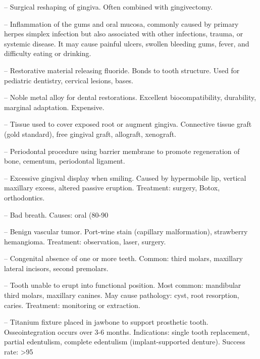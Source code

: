 -- Surgical reshaping of gingiva. Often combined with gingivectomy.

-- Inflammation of the gums and oral mucosa, commonly caused by primary herpes simplex infection but also associated with other infections, trauma, or systemic disease. It may cause painful ulcers, swollen bleeding gums, fever, and difficulty eating or drinking.

-- Restorative material releasing fluoride. Bonds to tooth structure. Used for pediatric dentistry, cervical lesions, bases.

-- Noble metal alloy for dental restorations. Excellent biocompatibility, durability, marginal adaptation. Expensive.

-- Tissue used to cover exposed root or augment gingiva. Connective tissue graft (gold standard), free gingival graft, allograft, xenograft.

-- Periodontal procedure using barrier membrane to promote regeneration of bone, cementum, periodontal ligament.

-- Excessive gingival display when smiling. Caused by hypermobile lip, vertical maxillary excess, altered passive eruption. Treatment: surgery, Botox, orthodontics.

-- Bad breath. Causes: oral (80-90%

-- Benign vascular tumor. Port-wine stain (capillary malformation), strawberry hemangioma. Treatment: observation, laser, surgery.

-- Congenital absence of one or more teeth. Common: third molars, maxillary lateral incisors, second premolars.

-- Tooth unable to erupt into functional position. Most common: mandibular third molars, maxillary canines. May cause pathology: cyst, root resorption, caries. Treatment: monitoring or extraction.

-- Titanium fixture placed in jawbone to support prosthetic tooth. Osseointegration occurs over 3-6 months. Indications: single tooth replacement, partial edentulism, complete edentulism (implant-supported denture). Success rate: >95%

